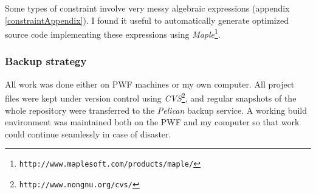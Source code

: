 Some types of constraint involve very messy algebraic expressions
(appendix \ref{constraintAppendix}). I found it useful to automatically generate optimized source
code implementing these expressions using
\textsl{Maple}\footnote{\texttt{http://www.maplesoft.com/products/maple/}}.

\subsubsection{Backup strategy}
All work was done either on PWF machines or my own computer. All project files were kept under
version control using \textsl{CVS}\footnote{\texttt{http://www.nongnu.org/cvs/}}, and regular
snapshots of the whole repository were transferred to the \textsl{Pelican} backup service.
A working build environment was maintained both on the PWF and my computer so that work could
continue seamlessly in case of disaster.

